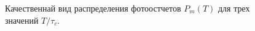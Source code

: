 \begin{figure}
\centering



\caption{Качественнай вид распределения фотоостчетов
  $P_m\left(T\right)$ для трех значений $T/\tau_c$.}
\label{figPart4Ch2_6}
\end{figure}
